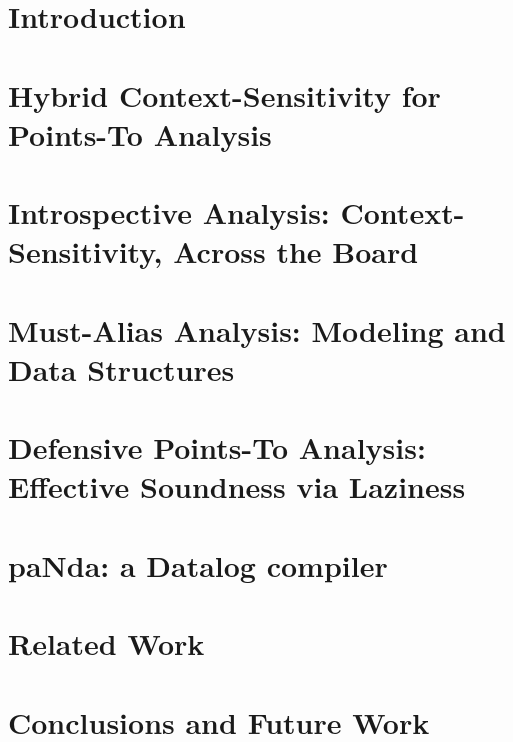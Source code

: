 \documentclass[ack,preface]{diphdthesis}
\begin{document}
\frontmatter

\mainmatter

\chapter{Introduction}


\chapter{Hybrid Context-Sensitivity for Points-To Analysis}


\chapter{Introspective Analysis: Context-Sensitivity,
Across the Board}


\chapter{Must-Alias Analysis: Modeling and Data Structures}


\chapter{Defensive Points-To Analysis: Effective Soundness via
Laziness}


\chapter{paNda: a Datalog compiler}


\chapter{Related Work}


\chapter{Conclusions and Future Work}


\backmatter
\end{document}
